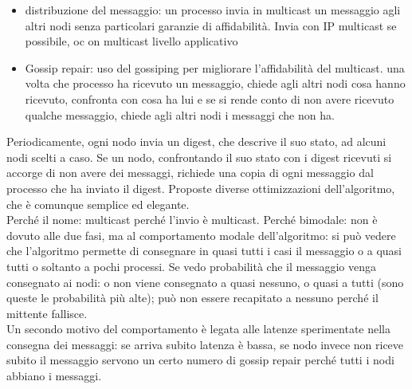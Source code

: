 \documentclass[16px]{article}
\begin{document}
\begin{itemize}
\item distribuzione del messaggio: un processo invia in multicast un messaggio agli altri nodi senza particolari garanzie di affidabilità. Invia con IP multicast se possibile, oc on multicast livello applicativo
\item Gossip repair: uso del gossiping per migliorare l'affidabilità del multicast. una volta che processo ha ricevuto un messaggio, chiede agli altri nodi cosa hanno ricevuto, confronta con cosa ha lui e se si rende conto di non avere ricevuto qualche messaggio, chiede agli altri nodi i messaggi che non ha.
\end{itemize}
Periodicamente, ogni nodo invia un digest, che descrive il suo stato, ad alcuni nodi scelti a caso. Se un nodo, confrontando il suo stato con i digest ricevuti si accorge di non avere dei messaggi, richiede una copia di ogni messaggio dal processo che ha inviato il digest. Proposte diverse ottimizzazioni dell'algoritmo, che è comunque semplice ed elegante.\\ Perché il nome: multicast perché l'invio è multicast. Perché bimodale: non è  dovuto alle due fasi, ma al comportamento modale dell'algoritmo: si può vedere che l'algoritmo permette di consegnare in quasi tutti i casi il messaggio o a quasi tutti o soltanto a pochi processi. Se vedo probabilità che il messaggio venga consegnato ai nodi: o non viene consegnato a quasi nessuno, o quasi a tutti (sono queste le probabilità più alte); può non essere recapitato a nessuno perché il mittente fallisce.\\ Un secondo motivo del comportamento è legata alle latenze sperimentate nella consegna dei messaggi: se arriva subito latenza è bassa, se nodo invece non riceve subito il messaggio servono un certo numero di gossip repair perché tutti i nodi abbiano i messaggi.
\end{document}
